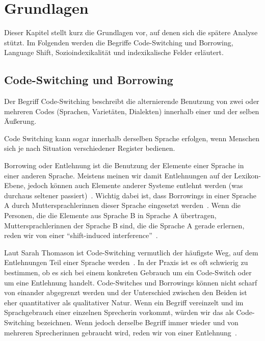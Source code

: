\section{Grundlagen}

\begin{comment}
Begriffe:
* code switching
(* borrowings)
* language shift
* Sozioindexikalität
* Indexical field?
* Medientheorie?
\end{comment}


Dieser Kapitel stellt kurz die Grundlagen vor, auf denen sich die spätere Analyse stützt.
Im Folgenden werden die Begriffe Code-Switching und Borrowing, Language Shift,
Sozioindexikalität und indexikalische Felder erläutert.

\subsection{Code-Switching und Borrowing}
Der Begriff Code-Switching beschreibt die alternierende Benutzung von zwei oder mehreren Codes (Sprachen, Varietäten, Dialekten) innerhalb einer und der selben Äußerung. %

Code Switching kann sogar innerhalb derselben Sprache erfolgen, wenn Menschen sich je nach Situation verschiedener Register bedienen.

Borrowing oder Entlehnung ist die Benutzung der Elemente einer Sprache in einer anderen Sprache.
Meistens meinen wir damit Entlehnungen auf der Lexikon-Ebene, jedoch können auch Elemente anderer Systeme entlehnt werden (was durchaus seltener passiert)~\cite{Thomason03}.%
Wichtig dabei ist, dass Borrowings in einer Sprache A durch Muttersprachlerinnen dieser Sprache eingesetzt werden~\cite{Thomason03}. %
Wenn die Personen, die die Elemente aus Sprache B in Sprache A übertragen, Muttersprachlerinnen der Sprache B sind, die die Sprache A gerade erlernen, reden wir von einer ``shift-induced interference''~\cite{Thomason03}. %

Laut Sarah Thomason ist Code-Switching vermutlich der häufigste Weg, auf dem Entlehnungen Teil einer Sprache werden~\cite{Thomason03}. %
In der Praxis ist es oft schwierig zu bestimmen, ob es sich bei einem konkreten Gebrauch um ein Code-Switch oder um eine Entlehnung handelt.
Code-Switches und Borrowings können nicht scharf von einander abgegrenzt werden und der Unterschied zwischen den Beiden ist eher quantitativer als qualitativer Natur.
Wenn ein Begriff vereinzelt und im Sprachgebrauch einer einzelnen Sprecherin vorkommt, würden wir das als Code-Switching bezeichnen.
Wenn jedoch derselbe Begriff immer wieder und von mehreren Sprecherinnen gebraucht wird, reden wir von einer Entlehnung~\cite{Thomason03}. %

